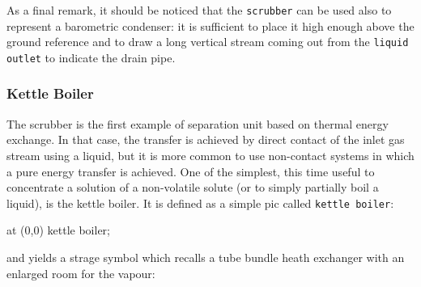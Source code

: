 \documentclass[12pt]{article}						%
\newcommand*{\chpn}[1]{\texttt{#1}}				%
\newcommand*{\chpp}[1]{\texttt{#1}}				%
\begin{document}
As a final remark, it should be noticed that the \chpp{scrubber} can be used
also to represent a barometric condenser: it is sufficient to place it high
enough above the ground reference and to draw a long vertical stream coming
out from the \chpn{liquid outlet} to indicate the drain pipe.

\subsubsection{Kettle Boiler}

The scrubber is the first example of separation unit based on thermal energy
exchange. In that case, the transfer is achieved by direct contact of the inlet
gas stream using a liquid, but it is more common to use non-contact systems in
which a pure energy transfer is achieved. One of the simplest, this time
useful to concentrate a solution of a non-volatile solute (or to simply
partially boil a liquid), is the kettle boiler. It is defined as a simple pic
called \chpp{kettle boiler}:
\begin{chpcode}
	\pic at (0,0) {kettle boiler};
\end{chpcode}
and yields a strage symbol which recalls a tube bundle heath exchanger with an
enlarged room for the vapour:
\begin{center}
\end{center}
\end{document}
